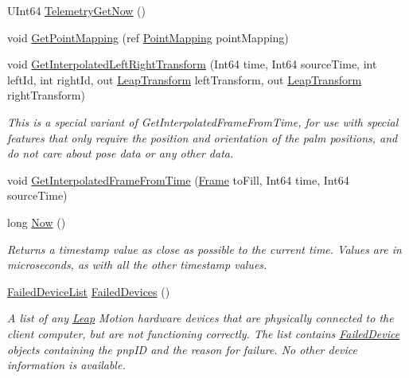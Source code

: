 \begin{DoxyCompactItemize}
\item 
U\+Int64 \mbox{\hyperlink{class_leap_1_1_controller_a30f5d6dc2dfdce1cb56bcd8de049c38e}{Telemetry\+Get\+Now}} ()
\item 
void \mbox{\hyperlink{class_leap_1_1_controller_a513b19658a9928fbcb338eda0dc49a13}{Get\+Point\+Mapping}} (ref \mbox{\hyperlink{struct_leap_1_1_point_mapping}{Point\+Mapping}} point\+Mapping)
\item 
void \mbox{\hyperlink{class_leap_1_1_controller_a10fe0670c31aa9c8193cde4abd57fcd7}{Get\+Interpolated\+Left\+Right\+Transform}} (Int64 time, Int64 source\+Time, int left\+Id, int right\+Id, out \mbox{\hyperlink{struct_leap_1_1_leap_transform}{Leap\+Transform}} left\+Transform, out \mbox{\hyperlink{struct_leap_1_1_leap_transform}{Leap\+Transform}} right\+Transform)
\begin{DoxyCompactList}\small\item\em This is a special variant of Get\+Interpolated\+Frame\+From\+Time, for use with special features that only require the position and orientation of the palm positions, and do not care about pose data or any other data. \end{DoxyCompactList}\item 
void \mbox{\hyperlink{class_leap_1_1_controller_ae025d7fd3e26a385907af50732d5cf6f}{Get\+Interpolated\+Frame\+From\+Time}} (\mbox{\hyperlink{class_leap_1_1_frame}{Frame}} to\+Fill, Int64 time, Int64 source\+Time)
\item 
long \mbox{\hyperlink{class_leap_1_1_controller_a57650944fa868adcfe4cea8608af5a03}{Now}} ()
\begin{DoxyCompactList}\small\item\em Returns a timestamp value as close as possible to the current time. Values are in microseconds, as with all the other timestamp values. \end{DoxyCompactList}\item 
\mbox{\hyperlink{class_leap_1_1_failed_device_list}{Failed\+Device\+List}} \mbox{\hyperlink{class_leap_1_1_controller_ab73815d54d49bf570371fe1ec39fe770}{Failed\+Devices}} ()
\begin{DoxyCompactList}\small\item\em A list of any \mbox{\hyperlink{namespace_leap}{Leap}} Motion hardware devices that are physically connected to the client computer, but are not functioning correctly. The list contains \mbox{\hyperlink{class_leap_1_1_failed_device}{Failed\+Device}} objects containing the pnp\+ID and the reason for failure. No other device information is available. \end{DoxyCompactList}\end{DoxyCompactItemize}
